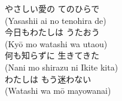 やさしい愛の てのひらで \\
(Yasashii ai no tenohira de) \\
今日もわたしは うたおう \\
(Kyō mo watashi wa utaou) \\
何も知らずに 生きてきた \\
(Nani mo shirazu ni Ikite kita) \\
わたしは もう迷わない \\
(Watashi wa mō mayowanai) \\
